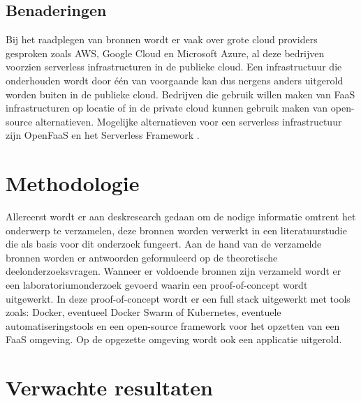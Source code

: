 \subsection{Benaderingen}
Bij het raadplegen van bronnen wordt er vaak over grote cloud providers gesproken zoals AWS, Google Cloud en Microsoft Azure, al deze bedrijven voorzien serverless infrastructuren in de publieke cloud. Een infrastructuur die onderhouden wordt door één van voorgaande kan dus nergens anders uitgerold worden buiten in de publieke cloud. Bedrijven die gebruik willen maken van FaaS infrastructuren op locatie of in de private cloud kunnen gebruik maken van open-source alternatieven. Mogelijke alternatieven voor een serverless infrastructuur zijn OpenFaaS \autocite{Ellis2017} en het Serverless Framework \autocite{Serverless2018}.



\section{Methodologie}
\label{sec:methodologie}

Allereerst wordt er aan deskresearch gedaan om de nodige informatie omtrent het onderwerp te verzamelen, deze bronnen worden verwerkt in een literatuurstudie die als basis voor dit onderzoek fungeert. Aan de hand van de verzamelde bronnen worden er antwoorden geformuleerd op de theoretische deelonderzoeksvragen. Wanneer er voldoende bronnen zijn verzameld wordt er een laboratoriumonderzoek gevoerd waarin een proof-of-concept wordt uitgewerkt. In deze proof-of-concept wordt er een full stack uitgewerkt met tools zoals: Docker, eventueel Docker Swarm of Kubernetes, eventuele automatiseringstools en een open-source framework voor het opzetten van een FaaS omgeving. Op de opgezette omgeving wordt ook een applicatie uitgerold.

\section{Verwachte resultaten}
\label{sec:verwachte_resultaten}

